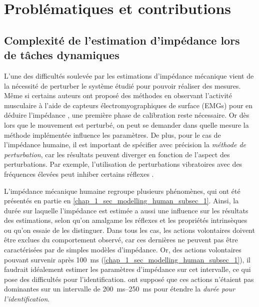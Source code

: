 %

\section{Problématiques et contributions}

\subsection{Complexité de l'estimation d'impédance lors de tâches dynamiques}

L'une des difficultés soulevée par les estimations d'impédance mécanique vient de la nécessité de perturber le système étudié pour pouvoir réaliser des mesures. Même si certains auteurs ont proposé des méthodes en observant l'activité musculaire à l'aide de capteurs électromyographiques de surface (EMGs) pour en déduire l'impédance \parencite{ajoudani_tele-impedance_2012, castellini_semg-based_2014, huang_adaptive_2020}, une première phase de calibration reste nécessaire. Or dès lors que le mouvement est perturbé, on peut se demander dans quelle mesure la méthode implémentée influence les paramètres. De plus, pour le cas de l'impédance humaine, il est important de spécifier avec précision la \emph{méthode de perturbation}, car les résultats peuvent diverger en fonction de l'aspect des perturbations. Par exemple, l'utilisation de perturbations vibratoires avec des fréquences élevées peut inhiber certains réflexes \parencite{lance_reflex_1973, kearney_identification_1997}.

L'impédance mécanique humaine regroupe plusieurs phénomènes, qui ont été présentés en partie en \cref{chap_1_sec_modelling_human_subsec_1}. Ainsi, la durée sur laquelle l'impédance est estimée a aussi une influence sur les résultats des estimations, selon qu'on amalgame les réflexes et les propriétés intrinsèques ou qu'on essaie de les distinguer. Dans tous les cas, les actions volontaires doivent être exclues du comportement observé, car ces dernières ne peuvent pas être caractérisées par de simples modèles d'impédance. Or, des actions volontaires pouvant survenir après \SI{100}{\milli\second} (\cref{chap_1_sec_modelling_human_subsec_1}), il faudrait idéalement estimer les paramètres d'impédance sur cet intervalle, ce qui pose des difficultés pour l'identification. \textcite{erden_end-point_2015, erden_hand_2015} ont supposé que ces actions n'étaient pas dominantes sur un intervalle de \SIrange{200}{250}{\milli\second} pour étendre la \emph{durée pour l'identification}.

